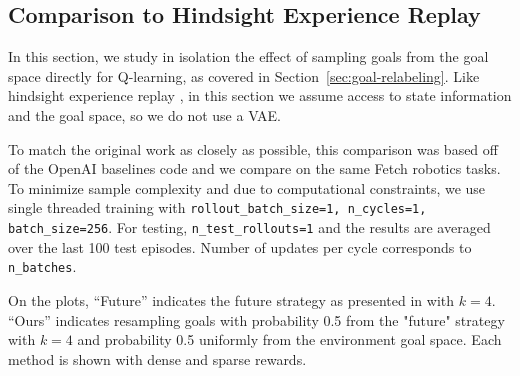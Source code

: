 \subsection{Comparison to Hindsight Experience Replay} \label{sec:her_relabeling_ablation}

In this section, we study in isolation the effect of sampling goals from the goal space directly for Q-learning, as covered in Section~\ref{sec:goal-relabeling}.
Like hindsight experience replay \cite{andrychowicz2017her}, in this section we assume access to state information and the goal space, so we do not use a VAE.

To match the original work as closely as possible, this comparison was based off of the OpenAI baselines code \cite{plappert2018techreport} and we compare on the same Fetch robotics tasks. To minimize sample complexity and due to computational constraints, we use single threaded training with \texttt{rollout\_batch\_size=1, n\_cycles=1, batch\_size=256}. For testing, \texttt{n\_test\_rollouts=1} and the results are averaged over the last 100 test episodes. Number of updates per cycle corresponds to \texttt{n\_batches}.

On the plots, ``Future'' indicates
the future strategy as presented in \citet{andrychowicz2017her} with $k=4$. ``Ours'' indicates
resampling goals with probability 0.5 from the "future" strategy with $k=4$ and probability 0.5 uniformly from the environment goal space. Each method is shown with dense and sparse rewards.

